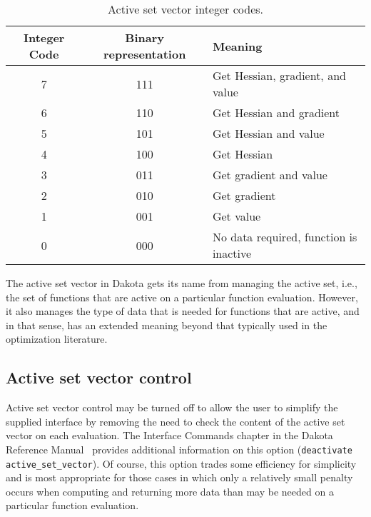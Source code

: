 \begin{table}
  \centering
  \caption{Active set vector integer codes.}
  \label{variables:table01}\vspace{2mm}
  \begin{tabular}{|c|c|l|}
    \hline
    Integer Code & Binary representation & Meaning \\
    \hline
    7 & 111 & Get Hessian, gradient, and value \\
    6 & 110 & Get Hessian and gradient \\
    5 & 101 & Get Hessian and value \\
    4 & 100 & Get Hessian \\
    3 & 011 & Get gradient and value \\
    2 & 010 & Get gradient \\
    1 & 001 & Get value \\
    0 & 000 & No data required, function is inactive \\
    \hline
  \end{tabular}
\end{table}

The active set vector in Dakota gets its name from managing the active
set, i.e., the set of functions that are active on a particular
function evaluation. However, it also manages the type of data that is
needed for functions that are active, and in that sense, has an
extended meaning beyond that typically used in the optimization
literature.

\subsection{Active set vector control}\label{variables:asv:control}

Active set vector control may be turned off to allow the user to
simplify the supplied interface by removing the need to check the
content of the active set vector on each evaluation. The Interface
Commands chapter in the Dakota Reference Manual~\cite{RefMan} provides
additional information on this option (\texttt{deactivate
active\_set\_vector}).  Of course, this option trades some efficiency
for simplicity and is most appropriate for those cases in which only a
relatively small penalty occurs when computing and returning more data
than may be needed on a particular function evaluation.

